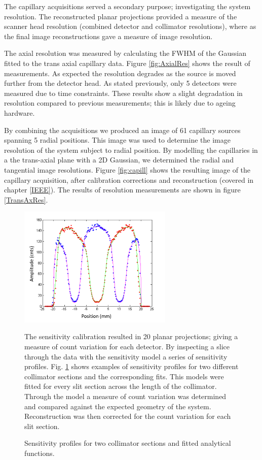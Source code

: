 The capillary acquisitions served a secondary purpose; investigating the system resolution. The reconstructed planar projections provided a measure of the scanner head resolution (combined detector and collimator resolutions), where as the final image reconstructions gave a measure of image resolution. 

The axial resolution was measured by calculating the \acrshort{FWHM} of the Gaussian fitted to the trans axial capillary data. Figure \ref{fig:AxialRes} shows the result of measurements. As expected the resolution degrades as the source is moved further from the detector head. As stated previously, only 5 detectors were measured due to time constraints. These results show a slight degradation in resolution compared to previous measurements; this is likely due to ageing hardware. 

By combining the acquisitions we produced an image of 61 capillary
sources spanning 5 radial positions. This image was used to
determine the image resolution of the system subject to radial
position. By modelling the capillaries in a the trans-axial plane
with a 2D Gaussian, we determined the radial and tangential
image resolutions. Figure \ref{fig:capill} shows the resulting image of the capillary acquisition, after calibration corrections and reconstruction (covered in chapter \ref{IEEE}). The results of resolution measurements are shown in figure \ref{TransAxRes}. 

\begin{figure}[!t]
\centering
\includegraphics[width=2.9in]{figures/sns_prof.png}

The sensitivity calibration resulted in 20 planar projections; giving a measure of count variation for each detector. By inspecting a slice through the data with the sensitivity model a series of sensitivity profiles. Fig. \ref{fig_sensprof} shows examples of sensitivity profiles for two different collimator sections and the corresponding fits. This models were fitted for every slit section across the length of the collimator. Through the model a measure of count variation was determined and compared against the expected geometry of the system. Reconstruction was then corrected for the count variation for each slit section. 

\caption{Sensitivity profiles for two collimator sections and fitted analytical functions.}
\label{fig_sensprof}
\end{figure}

